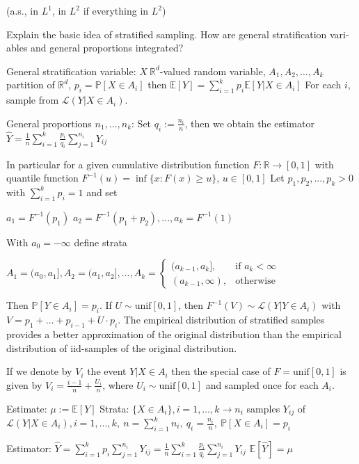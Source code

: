 (a.s., in \(L^1\), in \(L^2\) if everything in \(L^2\))


Explain the basic idea of stratified sampling. How are general stratification vari-
ables and general proportions integrated?

General stratification variable:
\(X \ \mathbb{R}^d\)-valued random variable, \(A_1, A_2, \dots, A_k\) partition of \(\mathbb{R}^d\), \(p_i = \mathbb{P}[X \in A_i]\)
then \(\mathbb{E}[Y] = \sum_{i=1}^k p_i \mathbb{E}[Y | X \in A_i]\)
For each \(i\), sample from \(\mathcal{L}(Y | X \in A_i)\).

General proportions \(n_1, \dots, n_k\):
Set \(q_i := \frac{n_i}{n}\), then we obtain the estimator
\(\hat{Y} = \frac{1}{n} \sum_{i=1}^k \frac{p_i}{q_i} \sum_{j=1}^{n_i} Y_{ij}\)


In particular for a given cumulative distribution function \(F: \mathbb{R} \rightarrow [0, 1]\) with quantile function \(F^{-1}(u) = \inf \{ x : F(x) \geq u \}\), 
\(u \in [0, 1]\)
Let \(p_1, p_2, ..., p_k > 0\) with \(\sum_{i=1}^{k} p_i = 1\) and set

\(a_1 = F^{-1}(p_1)\)
\(a_2 = F^{-1}(p_1 + p_2), ..., a_k = F^{-1}(1)\)

With \(a_0 = -\infty\) define strata

\(A_1 = (a_0, a_1], A_2 = (a_1, a_2], ..., A_k = \begin{cases}
(a_{k-1}, a_k], & \text{if } a_k < \infty \\
(a_{k-1}, \infty), & \text{otherwise}
\end{cases}\)

Then \(\mathbb{P}[Y \in A_i] = p_i\).
If \(U \sim \text{unif}[0, 1]\), then \(F^{-1}(V) \sim \mathcal{L}(Y | Y \in A_i)\) with \(V = p_1 + \dots + p_{i-1} + U \cdot p_i\).
The empirical distribution of stratified samples provides a better approximation of the original distribution than the empirical distribution of iid-samples of the original distribution.

If we denote by \( V_i \) the event \( Y|X \in A_i \) then the special case of \( F = \text{unif}[0, 1] \) is given by
\( V_i = \frac{i-1}{n} + \frac{U_i}{n}\), where \( U_i \sim \text{unif}[0, 1]\) and sampled once for each \( A_i \).

Estimate: \(\mu := \mathbb{E}[Y]\)
Strata: \(\{X \in A_i\}, i = 1, \dots, k \rightarrow n_i\) samples \(Y_{ij}\) of 
\(\mathcal{L}(Y|X \in A_i), i = 1, \dots, k,\ n = \sum_{i=1}^k n_i,\ q_i = \frac{n_i}{n},\ \mathbb{P}[X \in A_i] = p_i\)

Estimator: \(\hat{Y} = \sum_{i=1}^k p_i \sum_{j=1}^{n_i} Y_{ij} = \frac{1}{n} \sum_{i=1}^k \frac{p_i}{q_i} \sum_{j=1}^{n_i} Y_{ij}\)
\(\mathbb{E}[\hat{Y}] = \mu\)

